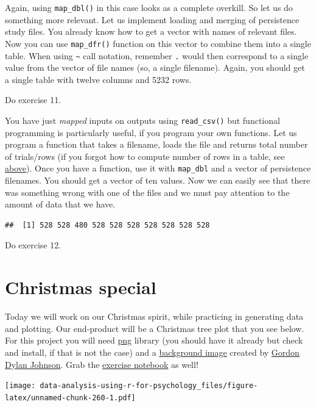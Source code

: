 \documentclass[
]{book}
\begin{document}
Again, using \texttt{map\_dbl()} in this case looks as a complete overkill. So let us do something more relevant. Let us implement loading and merging of persistence study files. You already know how to get a vector with names of relevant files. Now you can use \texttt{map\_dfr()} function on this vector to combine them into a single table. When using \texttt{\textasciitilde{}} call notation, remember \texttt{.} would then correspond to a single value from the vector of file names (so, a single filename). Again, you should get a single table with twelve columns and 5232 rows.

Do exercise 11.

You have just \emph{mapped} inputs on outputs using \texttt{read\_csv()} but functional programming is particularly useful, if you program your own functions. Let us program a function that takes a filename, loads the file and returns total number of trials/rows (if you forgot how to compute number of rows in a table, see \protect\hyperlink{forloop}{above}). Once you have a function, use it with \texttt{map\_dbl} and a vector of persistence filenames. You should get a vector of ten values. Now we can easily see that there was something wrong with one of the files and we must pay attention to the amount of data that we have.

\begin{verbatim}
##  [1] 528 528 480 528 528 528 528 528 528 528
\end{verbatim}

Do exercise 12.

\hypertarget{christmas-special}{%
\chapter{Christmas special}\label{christmas-special}}

Today we will work on our Christmas spirit, while practicing in generating data and plotting. Our end-product will be a Christmas tree plot that you see below. For this project you will need \href{https://cran.r-project.org/package=png}{png} library (you should have it already but check and install, if that is not the case) and a \href{images/christmas-background.png}{background image} created by \href{https://openclipart.org/artist/GDJ}{Gordon Dylan Johnson}. Grab the \href{notebooks/Seminar\%2010\%20-\%20Christmas\%20special.Rmd}{exercise notebook} as well!

\texttt{[image: data-analysis-using-r-for-psychology\_files/figure-latex/unnamed-chunk-260-1.pdf]}
\end{document}
